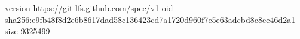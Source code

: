 version https://git-lfs.github.com/spec/v1
oid sha256:e9fb48f8d2e6b8617dad58c136423cd7a1720d960f7e5e63adcbd8c8ee46d2a1
size 9325499
